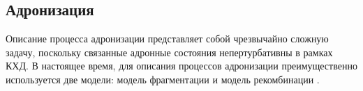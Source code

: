 \begin{comment}
Суть релятивистской гидродинамики можно кратко изложить с помощью основных уравнений \cite{Flow1}. Тензор напряжения определяется согласно следующему выражению:
\begin{equation}
	T^{\mu \nu}(x) = (\varepsilon(x)+p(x))u^{\mu}(x)u^{\nu}(x)+p(x)g^{\mu \nu}
	\label{eq:StressEnergyTensor}
\end{equation}
где $\varepsilon$ - плотность энергии, $p$ - давление, $u^{\mu}(x) = \gamma(1, v_x, v_y, v_z)$ - четырехвектор скорости, $\gamma = 1/ \sqrt{1 - v_x^2 - v_y^2 - v_z^2}$ - Лоренц-фактор, $g^{\mu \nu}$ - метрический тензор. Сохраняющиеся токи имеют вид $j_i^{\mu}(x) = n_i(x)u^{\mu}(x)$, где $n_i(x)$ - плотности чисел сохраняющихся величин (обычно заряда, барионного числа и странности). 

\begin{equation}
	\partial_{\mu}T^{\mu \nu}(x) = 0; \partial_{\mu}j^{\mu}_i(x) = 0
	\label{eq:HydronergyConvLaw}
\end{equation}

Законы сохранения \ref{eq:HydronergyConvLaw} определяют уравнения движения.  Количеству сохраняемых величин $k$ соответствует $2~+~k$ уравнений движения, содержащих $3~+~k$ неизвестных. Таким образом, для определения всех неизвестных необходимо еще одно уравнение. Недостающим уравнением является уравнение состояния, которое связывает плотность энергии, давление и плотность чисел сохраняемых величин. 
Уравнение состояния не может быть определено из первоначальных принципов и составляется с помощью расчетов КХД на решетке. 
\end{comment}

\subsection{Адронизация} \label{subsec:ch1/sec1_1}
Описание процесса адронизации представляет собой чрезвычайно сложную задачу, поскольку связанные адронные состояния непертурбативны в рамках КХД.
В настоящее время, для описания процессов адронизации преимущественно используется две модели: модель фрагментации \cite{FragmentationLund} и модель рекомбинации \cite{Coalescence_models}. 


